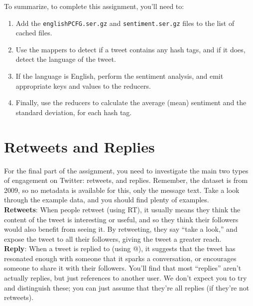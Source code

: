 \documentclass[a4paper,10pt]{article}
\begin{document}
  To summarize, to complete this assignment, you'll need to:
  
  \begin{enumerate}
    \item Add the \texttt{englishPCFG.ser.gz} and \texttt{sentiment.ser.gz} files to the list of cached files.
    \item Use the mappers to detect if a tweet contains any hash tags, and if it does, detect the language of the tweet.
    \item If the language is English, perform the sentiment analysis, and emit appropriate keys and values to the reducers.
    \item Finally, use the reducers to calculate the average (mean) sentiment and the standard deviation, for each hash tag.
  \end{enumerate}
   
  \section{Retweets and Replies}

  For the final part of the assignment, you need to investigate the main two types of
  engagement on Twitter: retweets, and replies. Remember, the dataset is from 2009,
  so no metadata is available for this, only the message text. Take a look through the
  example data, and you should find plenty of examples. \\

  \textbf{Retweets}: When people retweet (using RT), it usually means they think the content of the tweet is interesting or useful,
  and so they think their followers would also benefit from seeing it. By retweeting, they say ``take a look,''  and expose
  the tweet to all their followers, giving the tweet a greater reach. \\
  
  \textbf{Reply}: When a tweet is replied to (using @), it suggests that the tweet has
  resonated enough with someone that it sparks a conversation, or encourages
  someone to share it with their followers.
  You'll find that most ``replies'' aren't actually replies, but just references to another user. We don't expect you to try and distinguish these;
  you can just assume that they're all replies (if they're not retweets).
\end{document}
